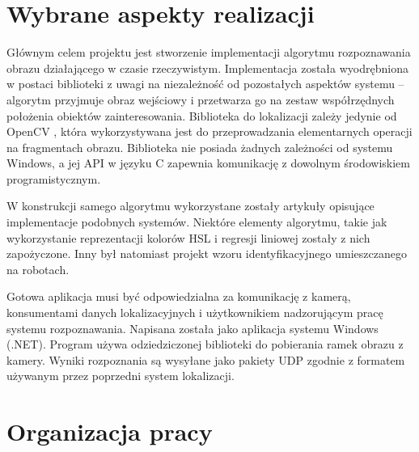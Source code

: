 \documentclass[polish,12pt]{aghthesis}
\begin{document}
\section{Wybrane aspekty realizacji}
\label{sec:wybrane-aspekty-realizacji}



Głównym celem projektu jest stworzenie implementacji algorytmu rozpoznawania
obrazu działającego w czasie rzeczywistym. Implementacja została wyodrębniona
w postaci biblioteki z uwagi na niezależność od pozostałych aspektów systemu --
algorytm przyjmuje obraz wejściowy i przetwarza go na zestaw współrzędnych
położenia obiektów zainteresowania. Biblioteka do lokalizacji zależy jedynie od 
OpenCV \cite{opencv}, która wykorzystywana jest do przeprowadzania 
elementarnych operacji na fragmentach obrazu. Biblioteka nie posiada żadnych 
zależności od systemu Windows, a jej API w języku C zapewnia komunikację z 
dowolnym środowiskiem programistycznym.

W konstrukcji samego algorytmu wykorzystane zostały artykuły opisujące
implementacje podobnych systemów\cite{colortag,largeleague,exemplary}. 
Niektóre elementy algorytmu, takie jak wykorzystanie
reprezentacji kolorów HSL i regresji liniowej zostały z nich zapożyczone. Inny
był natomiast projekt wzoru identyfikacyjnego umieszczanego na robotach.

Gotowa aplikacja musi być odpowiedzialna za komunikację z kamerą, 
konsumentami danych lokalizacyjnych i użytkownikiem nadzorującym pracę systemu
rozpoznawania. Napisana została jako aplikacja systemu
Windows (.NET). Program używa odziedziczonej biblioteki do pobierania ramek
obrazu z kamery. Wyniki rozpoznania są wysyłane jako pakiety UDP zgodnie z
formatem używanym przez poprzedni system lokalizacji.







\section{Organizacja pracy}
\label{sec:organizacja-pracy}
% 
\end{document}
